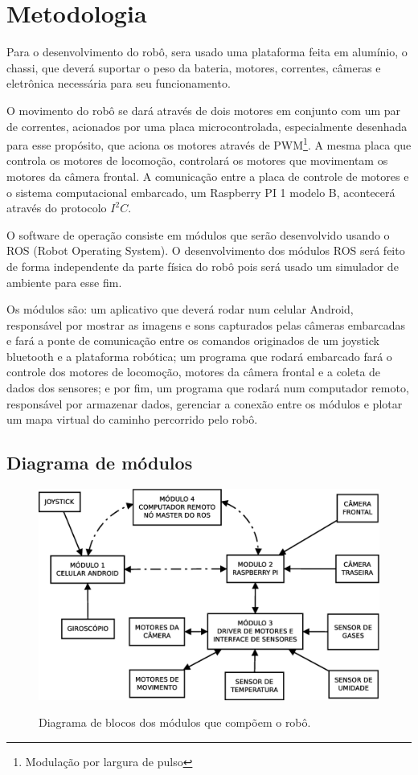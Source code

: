\documentclass[12pt,a4paper]{article}
\begin{document}
\section{Metodologia}
	Para o desenvolvimento do robô, sera usado uma plataforma feita em alumínio, o chassi, que deverá suportar o peso da bateria, motores, correntes, câmeras e eletrônica necessária para seu funcionamento.\par
	O movimento do robô se dará através de dois motores em conjunto com um par de correntes, acionados por uma placa microcontrolada, especialmente desenhada para esse propósito, que aciona os motores através de PWM\footnote{Modulação por largura de pulso}. A mesma placa que controla os motores de locomoção, controlará os motores que movimentam os motores da câmera frontal. A comunicação entre a placa de controle de motores e o sistema computacional embarcado, um Raspberry PI 1 modelo B, acontecerá através do protocolo $I^2C$. \par
	O software de operação consiste em módulos que serão desenvolvido usando o ROS (Robot Operating System). O desenvolvimento dos módulos ROS será feito de forma independente da parte física do robô pois será usado um simulador de ambiente para esse fim.\par
	Os módulos são: um aplicativo que deverá rodar num celular Android, responsável por mostrar as imagens e sons capturados pelas câmeras embarcadas e fará a ponte de comunicação entre os comandos originados de um joystick bluetooth e a plataforma robótica; um programa que rodará embarcado fará o controle dos motores de locomoção, motores da câmera frontal e a coleta de dados dos sensores; e por fim, um programa que rodará num computador remoto, responsável por armazenar dados, gerenciar a conexão entre os módulos e plotar um mapa virtual do caminho percorrido pelo robô. \par

\subsection{Diagrama de módulos}
\begin{figure}[H]
	\centering
	\includegraphics[scale=0.45]{diagrama-modulos} 
	\label{fig:diag-modulos}
	\caption{Diagrama de blocos dos módulos que compõem o robô.}
\end{figure}
\end{document}
